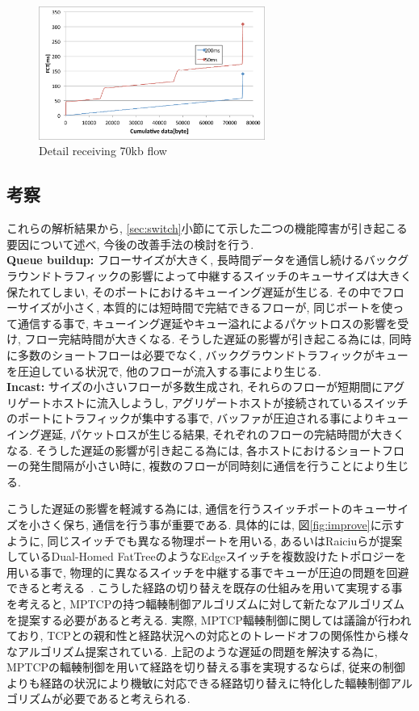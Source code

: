 \documentclass[10pt, a4paper, twocolumn]{jsarticle}
\begin{document}
\begin{figure}[h]
    \begin{center}
    \includegraphics[autoebb, width=210pt]{./img/detail.pdf}
    \caption{Detail receiving 70kb flow}
    \label{fig:detail}
    \end{center}
\end{figure}


\subsection{考察}
\label{sec:analysis}
これらの解析結果から, \ref{sec:switch}小節にて示した二つの機能障害が引き起こる要因について述べ, 今後の改善手法の検討を行う.\\
{\bf Queue buildup: }フローサイズが大きく,
長時間データを通信し続けるバックグラウンドトラフィックの影響によって中継するスイッチのキューサイズは大きく保たれてしまい,
そのポートにおけるキューイング遅延が生じる.
その中でフローサイズが小さく, 本質的には短時間で完結できるフローが, 同じポートを使って通信する事で,
キューイング遅延やキュー溢れによるパケットロスの影響を受け, フロー完結時間が大きくなる.
そうした遅延の影響が引き起こる為には, 同時に多数のショートフローは必要でなく, バックグラウンドトラフィックがキューを圧迫している状況で,
他のフローが流入する事により生じる.\\
{\bf Incast: }サイズの小さいフローが多数生成され, それらのフローが短期間にアグリゲートホストに流入しようし,
アグリゲートホストが接続されているスイッチのポートにトラフィックが集中する事で, バッファが圧迫される事によりキューイング遅延, パケットロスが生じる結果,
それぞれのフローの完結時間が大きくなる.
そうした遅延の影響が引き起こる為には, 各ホストにおけるショートフローの発生間隔が小さい時に, 複数のフローが同時刻に通信を行うことにより生じる.

こうした遅延の影響を軽減する為には, 通信を行うスイッチポートのキューサイズを小さく保ち, 通信を行う事が重要である.
具体的には, 図\ref{fig:improve}に示すように, 同じスイッチでも異なる物理ポートを用いる,
あるいはRaiciuらが提案しているDual-Homed FatTreeのようなEdgeスイッチを複数設けたトポロジーを用いる事で,
物理的に異なるスイッチを中継する事でキューが圧迫の問題を回避できると考える~\cite{improving}.
こうした経路の切り替えを既存の仕組みを用いて実現する事を考えると, MPTCPの持つ輻輳制御アルゴリズムに対して新たなアルゴリズムを提案する必要があると考える.
実際, MPTCP輻輳制御に関しては議論が行われており, TCPとの親和性と経路状況への対応とのトレードオフの関係性から様々なアルゴリズム提案されている.
上記のような遅延の問題を解決する為に, MPTCPの輻輳制御を用いて経路を切り替える事を実現するならば,
従来の制御よりも経路の状況により機敏に対応できる経路切り替えに特化した輻輳制御アルゴリズムが必要であると考えられる.
\end{document}
